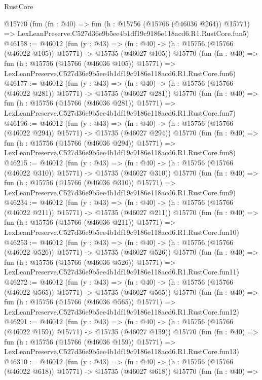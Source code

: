 \begin{lexlean}{RustCore}
\begin{coremodule}
    @15770
    (fun (fn : @40) =>
    fun (h : @15756 (@15766 (@46036 @264)) @15771) =>
    LexLeanPreserve.C527d36e9b5ee4b1df19c9186e118acd6.R1.RustCore.fun5)
@46158 := @46012
    (fun (y : @43) =>
    (fn : @40) -> (h : @15756 (@15766 (@46022 @105)) @15771) -> @15735 (@46027 @105))
    @15770
    (fun (fn : @40) =>
    fun (h : @15756 (@15766 (@46036 @105)) @15771) =>
    LexLeanPreserve.C527d36e9b5ee4b1df19c9186e118acd6.R1.RustCore.fun6)
@46177 := @46012
    (fun (y : @43) =>
    (fn : @40) -> (h : @15756 (@15766 (@46022 @281)) @15771) -> @15735 (@46027 @281))
    @15770
    (fun (fn : @40) =>
    fun (h : @15756 (@15766 (@46036 @281)) @15771) =>
    LexLeanPreserve.C527d36e9b5ee4b1df19c9186e118acd6.R1.RustCore.fun7)
@46196 := @46012
    (fun (y : @43) =>
    (fn : @40) -> (h : @15756 (@15766 (@46022 @294)) @15771) -> @15735 (@46027 @294))
    @15770
    (fun (fn : @40) =>
    fun (h : @15756 (@15766 (@46036 @294)) @15771) =>
    LexLeanPreserve.C527d36e9b5ee4b1df19c9186e118acd6.R1.RustCore.fun8)
@46215 := @46012
    (fun (y : @43) =>
    (fn : @40) -> (h : @15756 (@15766 (@46022 @310)) @15771) -> @15735 (@46027 @310))
    @15770
    (fun (fn : @40) =>
    fun (h : @15756 (@15766 (@46036 @310)) @15771) =>
    LexLeanPreserve.C527d36e9b5ee4b1df19c9186e118acd6.R1.RustCore.fun9)
@46234 := @46012
    (fun (y : @43) =>
    (fn : @40) -> (h : @15756 (@15766 (@46022 @211)) @15771) -> @15735 (@46027 @211))
    @15770
    (fun (fn : @40) =>
    fun (h : @15756 (@15766 (@46036 @211)) @15771) =>
    LexLeanPreserve.C527d36e9b5ee4b1df19c9186e118acd6.R1.RustCore.fun10)
@46253 := @46012
    (fun (y : @43) =>
    (fn : @40) -> (h : @15756 (@15766 (@46022 @526)) @15771) -> @15735 (@46027 @526))
    @15770
    (fun (fn : @40) =>
    fun (h : @15756 (@15766 (@46036 @526)) @15771) =>
    LexLeanPreserve.C527d36e9b5ee4b1df19c9186e118acd6.R1.RustCore.fun11)
@46272 := @46012
    (fun (y : @43) =>
    (fn : @40) -> (h : @15756 (@15766 (@46022 @565)) @15771) -> @15735 (@46027 @565))
    @15770
    (fun (fn : @40) =>
    fun (h : @15756 (@15766 (@46036 @565)) @15771) =>
    LexLeanPreserve.C527d36e9b5ee4b1df19c9186e118acd6.R1.RustCore.fun12)
@46291 := @46012
    (fun (y : @43) =>
    (fn : @40) -> (h : @15756 (@15766 (@46022 @159)) @15771) -> @15735 (@46027 @159))
    @15770
    (fun (fn : @40) =>
    fun (h : @15756 (@15766 (@46036 @159)) @15771) =>
    LexLeanPreserve.C527d36e9b5ee4b1df19c9186e118acd6.R1.RustCore.fun13)
@46310 := @46012
    (fun (y : @43) =>
    (fn : @40) -> (h : @15756 (@15766 (@46022 @618)) @15771) -> @15735 (@46027 @618))
    @15770
    (fun (fn : @40) =>

\end{coremodule}
\end{lexlean}
